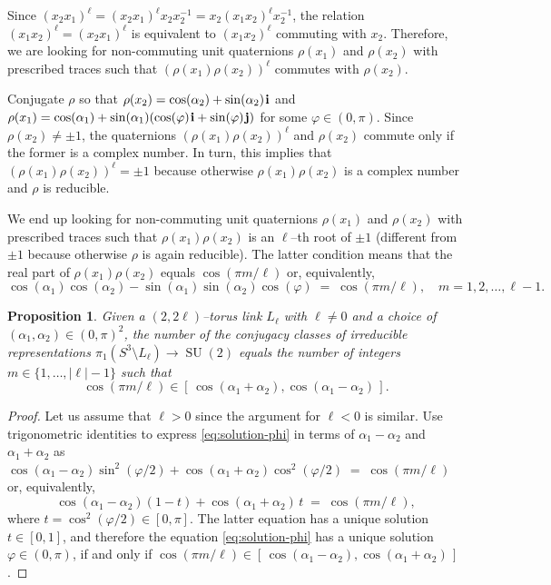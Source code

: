 \documentclass[11pt,reqno]{amsart}
\newtheorem{proposition}[theorem]{Proposition}
\theoremstyle{definition}
\renewcommand{\phi}{\varphi}
\renewcommand{\i}{\mspace{1.5mu}\mathbf i}
\renewcommand{\j}{\mspace{1.5mu}\mathbf j}
\newcommand{\SU}{\operatorname{SU}}
\begin{document}
\begin{sloppypar}
Since $(x_2 x_1)^{\ell} = (x_2 x_1)^{\ell} x_2 x_2^{-1} = x_2 (x_1 x_2)^{\ell} x_2^{-1}$, the relation $(x_1 x_2)^{\ell} = (x_2x_1)^{\ell}$ is equivalent to $(x_1 x_2)^{\ell}$ commuting with $x_2$. Therefore, we are looking for non-commuting unit quaternions $\rho(x_1)$ and $\rho(x_2)$ with prescribed traces such that $(\rho(x_1) \rho(x_2))^{\ell}$ commutes with $\rho(x_2)$. 

Conjugate $\rho$ so that $\rho(x_2) = \cos(\alpha_2) + \sin(\alpha_2) \i$ and $\rho(x_1) = \cos(\alpha_1) + \sin(\alpha_1) (\cos(\phi) \i + \sin(\phi) \j)$ for some $\phi \in (0, \pi)$. Since $\rho(x_2) \neq \pm 1$, the quaternions $(\rho(x_1) \rho(x_2))^{\ell}$ and $\rho(x_2)$ commute only if the former is a complex number. In turn, this implies that $(\rho(x_1) \rho(x_2))^{\ell} = \pm 1$ because otherwise $\rho(x_1)\rho(x_2)$ is a complex number and $\rho$ is reducible. 

We end up looking for non-commuting unit quaternions $\rho(x_1)$ and $\rho(x_2)$ with prescribed traces such that $\rho(x_1) \rho(x_2)$ is an $\ell$--th root of $\pm 1$ (different from $\pm 1$ because otherwise $\rho$ is again reducible). The latter condition means that the real part of $\rho(x_1) \rho(x_2)$ equals $\cos(\pi m/\ell)$ or, equivalently, 
\begin{equation}\label{eq:solution-phi}
 \cos(\alpha_1) \cos(\alpha_2) - \sin(\alpha_1) \sin(\alpha_2) \cos(\phi)\; = \; \cos(\pi m/\ell), \quad m = 1, 2, \dots, \ell - 1.
 \end{equation}

\begin{proposition}\label{P:solution-phi}
Given a $(2, 2 \ell)$--torus link $L_{\ell}$ with $\ell \neq 0$ and a choice of $(\alpha_1, \alpha_2) \in (0, \pi)^2$, the number of the conjugacy classes of irreducible representations $\pi_1 (S^3 \setminus L_{\ell}) \to \SU(2)$ equals the number of integers $m \in \{1,\ldots, |\ell| -1\}$ such that 
\[
\cos(\pi m/\ell) \in [\,\cos(\alpha_1 + \alpha_2), \cos(\alpha_1 - \alpha_2)\,].
\]
\end{proposition}

\begin{proof}
Let us assume that $\ell > 0$ since the argument for $\ell < 0$ is similar. Use trigonometric identities to express \eqref{eq:solution-phi} in terms of $\alpha_1 - \alpha_2$ and $\alpha_1 + \alpha_2$ as $\cos (\alpha_1 - \alpha_2) \sin^2 (\phi/2) + \cos (\alpha_1 + \alpha_2) \cos^2 (\phi/2)\; = \; \cos(\pi m/\ell)$ or, equivalently,
\[
\cos (\alpha_1 - \alpha_2) (1-t) + \cos (\alpha_1 + \alpha_2)\, t\; = \; \cos(\pi m/\ell),
\] 
where $t = \cos^2 (\phi/2) \in [0,\pi]$. The latter equation has a unique solution $t \in [0,1]$, and therefore the equation \eqref{eq:solution-phi} has a unique solution $\phi \in (0,\pi)$, if and only if $\cos(\pi m/\ell) \in [\,\cos(\alpha_1-\alpha_2), \cos(\alpha_1 + \alpha_2)\,]$. 
\end{proof} 


\end{sloppypar}
\end{document}
